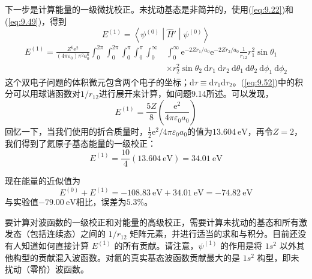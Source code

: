     下一步是计算能量的一级微扰校正。未扰动基态是非简并的，使用(\ref{eq:9.22})和(\ref{eq:9.49})，得到
    \begin{equation*}
        E^{\left(1\right)} = \left\langle \psi^{\left(0\right)} \middle| \hat{H}' \middle| \psi^{\left(0\right)} \right\rangle
    \end{equation*}
    \begin{equation}
        \begin{aligned}
            E^{\left(1\right)} = \frac{Z^6\mathrm{e}^2}{\left(4\pi\varepsilon_0\right)\pi^2a_0^6} \int_{0}^{2\pi} \int_{0}^{2\pi} \int_{0}^{\pi} \int_{0}^{\pi} \int_{0}^{\infty} & \int_{0}^{\infty}  \mathrm{e}^{-2Zr_1/a_0} \mathrm{e}^{-2Zr_2/a_0} \frac{1}{r_{12}}r_1^2 \sin\theta_1 \\
            & \times r^2 _2 \sin\theta_2 \:\mathrm{d}r_1 \:\mathrm{d}r_2 \:\mathrm{d}\theta_1 \:\mathrm{d}\theta_2 \:\mathrm{d}\phi_1 \:\mathrm{d}\phi_2
        \end{aligned}
        \label{eq:9.52}
    \end{equation}
    这个双电子问题的体积微元包含两个电子的坐标；$\mathrm{d}\tau \equiv \mathrm{d}\tau_1 \mathrm{d}\tau_2$。(\ref{eq:9.52})中的积分可以用球谐函数对$1/r_{12}$进行展开来计算，如问题9.14所述。可以发现，
    \begin{equation}
        E^{\left(1\right)} = \frac{5Z}{8}\left(\frac{\mathrm{e}^2}{4\pi\varepsilon_0a_0}\right)
        \label{eq:9.53}
    \end{equation}
    回忆一下，当我们使用的折合质量时，$\frac{1}{2}\mathrm{e}^2/4\pi\varepsilon_0a_0$的值为$13.604 \: \mathrm{eV}$，再令$Z=2$，我们得到了氦原子基态能量的一级校正：
    \begin{equation*}
        E^{\left(1\right)} = \frac{10}{4}\left(13.604 \: \mathrm{eV}\right) = 34.01 \: \mathrm{eV}
    \end{equation*}

    现在能量的近似值为
    \begin{equation}
        E^{\left(0\right)} + E^{\left(1\right)} = -108.83 \: \mathrm{eV} + 34.01 \: \mathrm{eV} = -74.82 \: \mathrm{eV}
        \label{eq:9.54}
    \end{equation}
    与实验值$-79.00 \: \mathrm{eV}$相比，误差为$5.3\%$。

    要计算对波函数的一级校正和对能量的高级校正，需要计算未扰动的基态和所有激发态（包括连续态）之间的 $1/r_{12}$ 矩阵元素，并进行适当的求和与积分。目前还没有人知道如何直接计算 $E^{\left(1\right)}$ 的所有贡献。请注意，$\psi^{\left(1\right)}$ 的作用是将 $1s^2$ 以外其他构型的贡献混入波函数。对氦的真实基态波函数贡献最大的是 $1s^2$ 构型，即未扰动（零阶）波函数。

